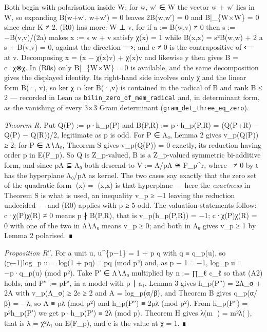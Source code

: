 \documentclass[11pt,a4paper]{article}
\theoremstyle{named}
\begin{document}
Both begin with polarisation inside W: for w, w′ ∈ W the vector w + w′ lies in W, so expanding B(w+w′, w+w′) = 0 leaves 2B(w,w′) = 0 and B|\_\{W×W\} = 0 since char K ≠ 2. (R0) has more: W ⊥ v, for if a := B(w,v) ≠ 0 then s := −B(v,v)/(2a) makes x := s w + v satisfy χ(x) = 1 while B(x,x) = s²B(w,w) + 2 a s + B(v,v) = 0, against the direction ⟹; and c ≠ 0 is the contrapositive of ⟸ at v. Decomposing x = (x − χ(x)v) + χ(x)v and likewise y then gives B = c·χ⊗χ. In (R0s) only B|\_\{W×W\} = 0 is available, and the same decomposition gives the displayed identity. Its right-hand side involves only χ and the linear form B(·, v), so ker χ ∩ ker B(·,v) is contained in the radical of B and rank B ≤ 2 — recorded in Lean as \texttt{bilin\_\allowbreak{}zero\_\allowbreak{}of\_\allowbreak{}mem\_\allowbreak{}radical} and, in determinant form, as the vanishing of every 3×3 Gram determinant (\texttt{gram\_\allowbreak{}det\_\allowbreak{}three\_\allowbreak{}eq\_\allowbreak{}zero}).

\textit{Theorem R.} Put Q(P) := p·h\_p(P) and B(P,R) := p·h\_p(P,R) = (Q(P+R) − Q(P) − Q(R))/2, legitimate as p is odd. For P ∈ Λ₀, Lemma 2 gives v\_p(Q(P)) ≥ 2; for P ∈ Λ∖Λ₀, Theorem S gives v\_p(Q(P)) = 0 exactly, its reduction having order p in E(F\_p). So Q is Z\_p-valued, B is a Z\_p-valued symmetric bi-additive form, and since pΛ ⊆ Λ₀ both descend to V := Λ/pΛ ≅ F\_p\textasciicircum{}r, where  ≠ 0 by ι has the hyperplane Λ₀/pΛ as kernel. The two cases say exactly that the zero set of the quadratic form (x) = (x,x) is that hyperplane — here the \textit{exactness} in Theorem S is what is used, an inequality v\_p ≥ −1 leaving the reduction undecided — and (R0) applies with p ≥ 5 odd. The valuation statements follow: c·χ(P)χ(R) ≠ 0 means p ∤ B(P,R), that is v\_p(h\_p(P,R)) = −1; c·χ(P)χ(R) = 0 with one of the two in Λ∖Λ₀ means v\_p ≥ 0; and both in Λ₀ gives v\_p ≥ 1 by Lemma 2 polarised. ∎

\textit{Proposition R″.} For a unit u, u\textasciicircum{}\{p−1\} = 1 + p q with q ≡ q\_p(u), so (p−1)log\_p u = log(1 + pq) ≡ pq (mod p²) and, as p − 1 ≡ −1, log\_p u ≡ −p·q\_p(u) (mod p²). Take P′ ∈ Λ∖Λ₀ multiplied by n := ∏\_ℓ c\_ℓ so that (A2) holds, and P″ := pP′, in a model with p ∣ a₁. Lemma 3 gives h\_p(P″) = 2Λ\_σ + 2A with v\_p(Λ\_σ) ≥ 2e ≥ 2 and A = log\_p(α/β), and Theorem B gives q\_p(α/β) = −λ, so A ≡ pλ (mod p²) and h\_p(P″) ≡ 2pλ (mod p²). From h\_p(P″) = p²h\_p(P′) we get p·h\_p(P′) ≡ 2λ (mod p). Theorem H gives λ(m ) = m²λ(), that is λ = χ²λ₁ on E(F\_p), and c is the value at χ = 1. ∎
\end{document}
